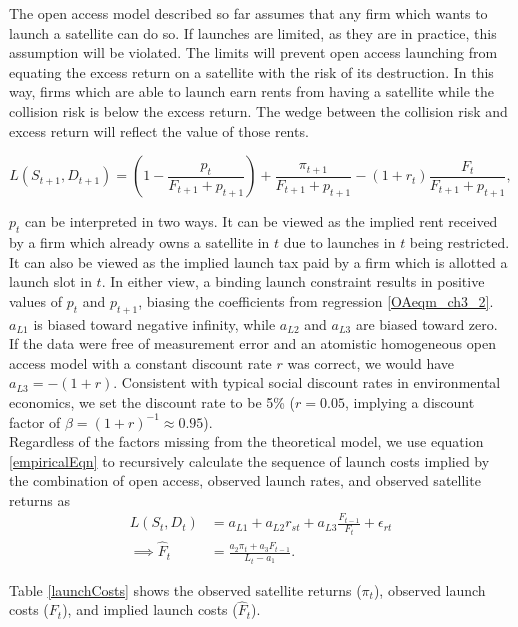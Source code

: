\documentclass[12pt]{article}
\begin{document}
The open access model described so far assumes that any firm which wants to launch a satellite can do so. If launches are limited, as they are in practice, this assumption will be violated. The limits will prevent open access launching from equating the excess return on a satellite with the risk of its destruction. In this way, firms which are able to launch earn rents from having a satellite while the collision risk is below the excess return. The wedge between the collision risk and excess return will reflect the value of those rents.

\begin{equation}
\label{OAfloweqmcond}
L(S_{t+1},D_{t+1}) = \left(1 - \frac{p_t}{F_{t+1} + p_{t+1}} \right) + \frac{\pi_{t+1}}{F_{t+1} + p_{t+1}} - (1+r_t)\frac{F_t}{F_{t+1} + p_{t+1}},
\end{equation}

$p_t$ can be interpreted in two ways. It can be viewed as the implied rent received by a firm which already owns a satellite in $t$ due to launches in $t$ being restricted. It can also be viewed as the implied launch tax paid by a firm which is allotted a launch slot in $t$. In either view, a binding launch constraint results in positive values of $p_t$ and $p_{t+1}$, biasing the coefficients from regression \ref{OAeqm_ch3_2}. $a_{L1}$ is biased toward negative infinity, while $a_{L 2}$ and $a_{L 3}$ are biased toward zero. \\

If the data were free of measurement error and an atomistic homogeneous open access model with a constant discount rate $r$ was correct, we would have $a_{L3} = - (1+r)$. Consistent with typical social discount rates in environmental economics, we set the discount rate to be 5\% ($r=0.05$, implying a discount factor of $\beta = (1+r)^{-1} \approx 0.95$). \\

Regardless of the factors missing from the theoretical model, we use equation \ref{empiricalEqn} to recursively calculate the sequence of launch costs implied by the combination of open access, observed launch rates, and observed satellite returns as
\begin{align}
L(S_t,D_t) &= a_{L 1} + a_{L 2} r_{st} + a_{L 3} \frac{F_{t-1}}{F_t} + \epsilon_{r t} \nonumber \\
\implies \hat{F}_t &=	\frac{a_2 \pi_t + a_3 F_{t-1}}{L_t - a_1}.
\label{recursive_impliedcosts}
\end{align}

Table \ref{launchCosts} shows the observed satellite returns ($\pi_t$), observed launch costs ($F_t$), and implied launch costs ($\hat{F}_t$). \\
\end{document}
